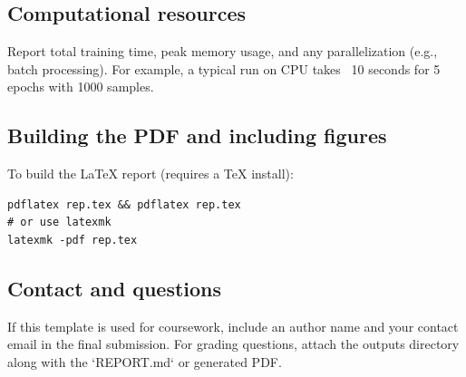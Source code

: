 \documentclass[11pt]{article}
\begin{document}
\subsection*{Computational resources}
Report total training time, peak memory usage, and any parallelization (e.g., batch processing). For example, a typical run on CPU takes ~10 seconds for 5 epochs with 1000 samples.

\subsection*{Building the PDF and including figures}
To build the LaTeX report (requires a TeX install):
\begin{verbatim}
pdflatex rep.tex && pdflatex rep.tex
# or use latexmk
latexmk -pdf rep.tex
\end{verbatim}

\subsection*{Contact and questions}
If this template is used for coursework, include an author name and your contact email in the final submission. For grading questions, attach the outputs directory along with the `REPORT.md` or generated PDF.
\end{document}
